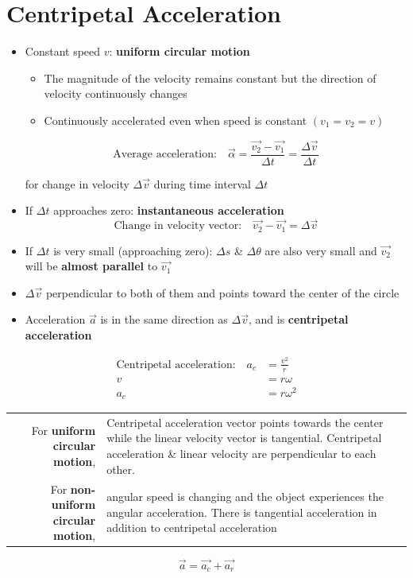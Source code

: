 \section{Centripetal Acceleration}
\begin{itemize}
	\item Constant speed $v$: \textbf{uniform circular motion}
	\begin{itemize}
		\item The magnitude of the velocity remains constant but the direction of velocity continuously changes
		\item Continuously accelerated even when speed is constant $ (v_1 = v_2 = v) $
	\end{itemize}
	\begin{equation}
		\text{Average acceleration:}\quad
		\vec{\alpha} =
		\frac{\vec{v_2} - \vec{v_1}}{\Delta t} =
		\frac{\Delta\vec{v}}{\Delta t}
	\end{equation}
	\nopagebreak
	\begin{center}
			for change in velocity $\Delta\vec{v}$ during time interval $\Delta t$
	\end{center}
\end{itemize}
\begin{itemize}\
	\item If $\Delta t$ approaches zero: \textbf{instantaneous acceleration}
		\begin{equation}
			\text{Change in velocity vector:}\quad
			\vec{v_2} - \vec{v_1} = \Delta\vec{v}
		\end{equation}
	\item If $\Delta t$ is very small (approaching zero):
		$\Delta s$ \& $\Delta \theta$ are also very small
		and $\vec{v_2}$ will be \textbf{almost parallel} to $\vec{v_1}$ 
	\item $\Delta\vec{v}$ perpendicular to both of them
		and points toward the center of the circle
	\item Acceleration $\vec{a}$ is in the same direction as $\Delta\vec{v}$,
		and is \textbf{centripetal acceleration}
\end{itemize}
\begin{align}
	\text{Centripetal acceleration:}\quad
	a_c &= \frac{v^2}{r} \\
	v &= r\omega \\
	a_c &= r\omega^2
\end{align}

\begin{tabular}{r p{}}
	For \textbf{uniform circular motion}, &
		Centripetal acceleration vector points towards the center
		while the linear velocity vector is tangential.
		\newline
		Centripetal acceleration \& linear velocity are perpendicular to each other.
		\\ \noalign{\medskip}
	For \textbf{non-uniform circular motion}, &
		angular speed is changing and the object experiences the angular acceleration.
		\newline
		There is tangential acceleration in addition to centripetal acceleration
\end{tabular}
\begin{equation}
		\vec{a} = \vec{a_c} + \vec{a_r}
\end{equation}

